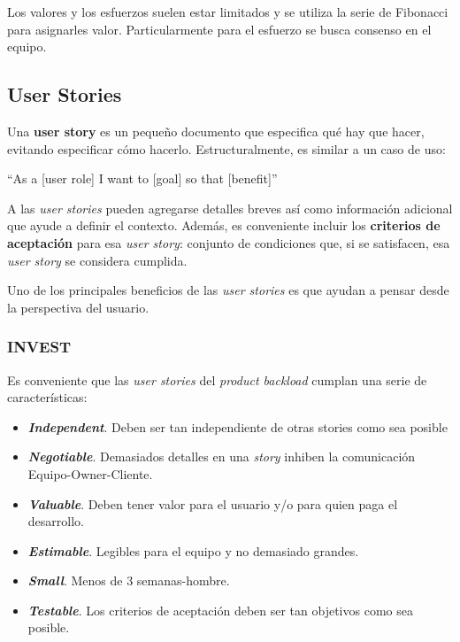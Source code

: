 \documentclass[]{article}
\begin{document}
Los valores y los esfuerzos suelen estar limitados y se utiliza la serie de Fibonacci para asignarles valor. Particularmente para el esfuerzo se busca consenso en el equipo.




\subsection{User Stories}
Una \textbf{user story} es un pequeño documento que especifica qué hay que hacer, evitando especificar cómo hacerlo. Estructuralmente, es similar a un caso de uso:
\begin{center}
	``As a [user role] I want to [goal] so that [benefit]''
\end{center}

A las \emph{user stories} pueden agregarse detalles breves así como información adicional que ayude a definir el contexto. Además, es conveniente incluir los \textbf{criterios de aceptación} para esa \emph{user story}: conjunto de condiciones que, si se satisfacen, esa \emph{user story} se considera cumplida.

Uno de los principales beneficios de las \emph{user stories} es que ayudan a pensar desde la perspectiva del usuario.

\subsubsection{INVEST}
Es conveniente que las \emph{user stories} del \emph{product backload} cumplan una serie de características:
\begin{itemize}
	\item \textbf{\emph{Independent}}. Deben ser tan independiente de otras stories como sea posible
	\item \textbf{\emph{Negotiable}}. Demasiados detalles en una \emph{story} inhiben la comunicación Equipo-Owner-Cliente.
	\item \textbf{\emph{Valuable}}. Deben tener valor para el usuario y/o para quien paga el desarrollo.
	\item \textbf{\emph{Estimable}}. Legibles para el equipo y no demasiado grandes.
	\item \textbf{\emph{Small}}. Menos de 3 semanas-hombre.
	\item \textbf{\emph{Testable}}. Los criterios de aceptación deben ser tan objetivos como sea posible.
\end{itemize}
\end{document}

